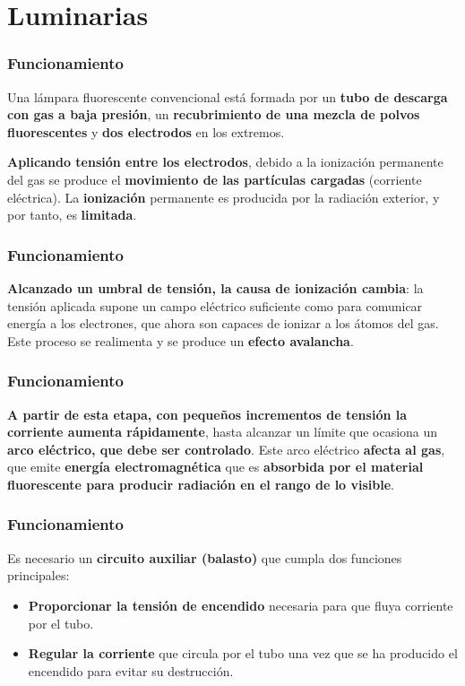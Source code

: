 \documentclass[serif, xcolor=dvipsnames]{beamer}
\begin{document}
\section{Luminarias}


\begin{frame}
\frametitle{Funcionamiento}

Una lámpara fluorescente convencional está formada por un\textbf{
tubo de descarga con gas a baja presión}, un \textbf{recubrimiento
de una mezcla de polvos fluorescentes} y \textbf{dos electrodos} en
los extremos. 

\textbf{Aplicando tensión entre los electrodos}, debido a la ionización
permanente del gas se produce el \textbf{movimiento de las partículas
cargadas} (corriente eléctrica). La \textbf{ionización }permanente
es producida por la radiación exterior, y por tanto, es \textbf{limitada}. 


\end{frame}

\begin{frame}
\frametitle{Funcionamiento}

\textbf{Alcanzado un umbral de tensión, la causa de ionización cambia}:
la tensión aplicada supone un campo eléctrico suficiente como para
comunicar energía a los electrones, que ahora son capaces de ionizar
a los átomos del gas. Este proceso se realimenta y se produce un \textbf{efecto
avalancha}. 


\end{frame}

\begin{frame}
\frametitle{Funcionamiento}

\textbf{A partir de esta etapa, con pequeños incrementos de tensión
la corriente aumenta rápidamente}, hasta alcanzar un límite que ocasiona
un \textbf{arco eléctrico, que debe ser controlado}. Este arco eléctrico
\textbf{afecta al gas}, que emite \textbf{energía electromagnética}
que es \textbf{absorbida por el material fluorescente para producir
radiación en el rango de lo visible}.


\end{frame}

\begin{frame}
\frametitle{Funcionamiento}

Es necesario un \textbf{circuito auxiliar (balasto)} que cumpla dos
funciones principales:
\begin{itemize}
\item \textbf{Proporcionar la tensión de encendido} necesaria para que fluya
corriente por el tubo.
\item \textbf{Regular la corriente} que circula por el tubo una vez que
se ha producido el encendido para evitar su destrucción.
\end{itemize}

\end{frame}
\end{document}
